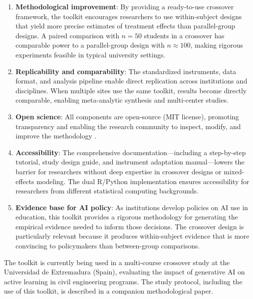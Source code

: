\documentclass[authoryear,preprint,review,12pt]{elsarticle}
\begin{document}
\begin{enumerate}
    \item \textbf{Methodological improvement}: By providing a ready-to-use
    crossover framework, the toolkit encourages researchers to use
    within-subject designs that yield more precise estimates of treatment
    effects than parallel-group designs. A paired comparison with $n = 50$
    students in a crossover has comparable power to a parallel-group design
    with $n \approx 100$, making rigorous experiments feasible in typical
    university settings.

    \item \textbf{Replicability and comparability}: The standardized
    instruments, data format, and analysis pipeline enable direct
    replication across institutions and disciplines. When multiple sites
    use the same toolkit, results become directly comparable, enabling
    meta-analytic synthesis and multi-center studies.

    \item \textbf{Open science}: All components are open-source (MIT license),
    promoting transparency and enabling the research community to inspect,
    modify, and improve the methodology \citep{nosek2015promoting,
    wilson2017softwarex}.

    \item \textbf{Accessibility}: The comprehensive documentation---including
    a step-by-step tutorial, study design guide, and instrument adaptation
    manual---lowers the barrier for researchers without deep expertise in
    crossover designs or mixed-effects modeling. The dual R/Python
    implementation ensures accessibility for researchers from different
    statistical computing backgrounds.

    \item \textbf{Evidence base for AI policy}: As institutions develop
    policies on AI use in education, this toolkit provides a rigorous
    methodology for generating the empirical evidence needed to inform
    those decisions. The crossover design is particularly relevant because
    it produces within-subject evidence that is more convincing to
    policymakers than between-group comparisons.
\end{enumerate}

The toolkit is currently being used in a multi-course crossover study at the
Universidad de Extremadura (Spain), evaluating the impact of generative AI
on active learning in civil engineering programs. The study protocol,
including the use of this toolkit, is described in a companion methodological
paper.
\end{document}
